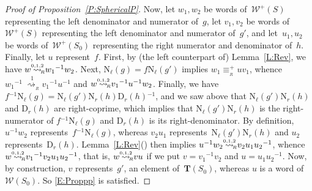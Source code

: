 \documentclass{amsart}
\numberwithin{equation}{section}
\theoremstyle{plain}
\theoremstyle{definition}
\newcounter{ITEM}
\begin{document}
\begin{proof}[Proof of Proposition~\ref{P:SphericalP}]
Now, let ${w}_1, {w}_2$ be words of~${\mathcal{W}^{\scriptscriptstyle+}\!({S})}$ representing the left denominator and numerator of~${g}$, let ${v}_1, {v}_2$ be words of~${\mathcal{W}^{\scriptscriptstyle+}\!({S})}$ representing the left denominator and numerator of~${g}'$, and let~${u}_1, {u}_2$ be words of~${\mathcal{W}^{\scriptscriptstyle+}\!({{S}_0})}$ representing the right numerator and denominator of~${h}$. Finally, let ${u}$ represent~${f}$. First, by (the left counterpart of) Lemma~\ref{L:Rev}, we have ${w} {\mathrel{{\mathrel{\overset{\scriptscriptstyle 0,1,2}{\rightsquigarrow}}}_{\hspace{-0.9ex}{\scriptscriptstyle R}}}} {w}_1{^{-1}} {w}_2$. Next, ${{\scriptstyle\mathrm{N}}{_{\ell}}({g})} = {f} {{\scriptstyle\mathrm{N}}{_{\ell}}({{g}'})}$ implies ${w}_1 {\equiv_{{\!{}_{R}}}^{\scriptscriptstyle+}} {u} {v}_1$, whence ${w}_1{^{-1}} {\mathrel{\overset{1}{\ \rightsquigarrow_{{\!{}_{R}}}}}} {v}_1{^{-1}} {u}{^{-1}}$ and ${w} {\mathrel{{\mathrel{\overset{\scriptscriptstyle 0,1,2}{\rightsquigarrow}}}_{\hspace{-0.9ex}{\scriptscriptstyle R}}}} {v}_1{^{-1}} {u}{^{-1}} {w}_2$. Finally, we have ${f}{^{-1}} {{\scriptstyle\mathrm{N}}{_{\ell}}({g})} = {{\scriptstyle\mathrm{N}}{_{\ell}}({{g}'})} {{\scriptstyle\mathrm{N}}{_{r}}({h})} {{\scriptstyle\mathrm{D}}{_{r}}({h})}{^{-1}}$, and we saw above that ${{\scriptstyle\mathrm{N}}{_{\ell}}({{g}'})} {{\scriptstyle\mathrm{N}}{_{r}}({h})}$ and ${{\scriptstyle\mathrm{D}}{_{r}}({h})}$ are right-coprime, which implies that ${{\scriptstyle\mathrm{N}}{_{\ell}}({{g}'})} {{\scriptstyle\mathrm{N}}{_{r}}({h})}$ is the right-numerator of ${f}{^{-1}} {{\scriptstyle\mathrm{N}}{_{\ell}}({g})}$ and ${{\scriptstyle\mathrm{D}}{_{r}}({h})}$ is its right-denominator. By definition, ${u}{^{-1}} {w}_2$ represents~${f}{^{-1}} {{\scriptstyle\mathrm{N}}{_{\ell}}({g})}$, whereas ${v}_2 {u}_1$ represents~${{\scriptstyle\mathrm{N}}{_{\ell}}({{g}'})} {{\scriptstyle\mathrm{N}}{_{r}}({h})}$ and ${u}_2$ represents~${{\scriptstyle\mathrm{D}}{_{r}}({h})}$. Lemma~\ref{L:Rev}{\setcounter{ITEM}{2}\leavevmode\hbox{\rm()}} then implies ${u}{^{-1}} {w}_2 {\mathrel{{\mathrel{\overset{\scriptscriptstyle 0,1,2}{\rightsquigarrow}}}_{\hspace{-0.9ex}{\scriptscriptstyle R}}}} {v}_2 {u}_1 {u}_2{^{-1}}$, whence ${w} {\mathrel{{\mathrel{\overset{\scriptscriptstyle 0,1,2}{\rightsquigarrow}}}_{\hspace{-0.9ex}{\scriptscriptstyle R}}}} {v}_1{^{-1}} {v}_2 {u}_1 {u}_2{^{-1}}$, that is, ${w} {\mathrel{{\mathrel{\overset{\scriptscriptstyle 0,1,2}{\rightsquigarrow}}}_{\hspace{-0.9ex}{\scriptscriptstyle R}}}} {v} {u}$ if we put ${v} = {v}_1{^{-1}} {v}_2$ and ${u} = {u}_1 {u}_2{^{-1}}$. Now, by construction, ${v}$ represents~${g}'$, an element of~${\boldsymbol{T}}({S}_0)$, whereas ${u}$ is a word of~${\mathcal{W}({{S}_0})}$. So \eqref{E:Proppp} is satisfied.
\end{proof}
\end{document}
